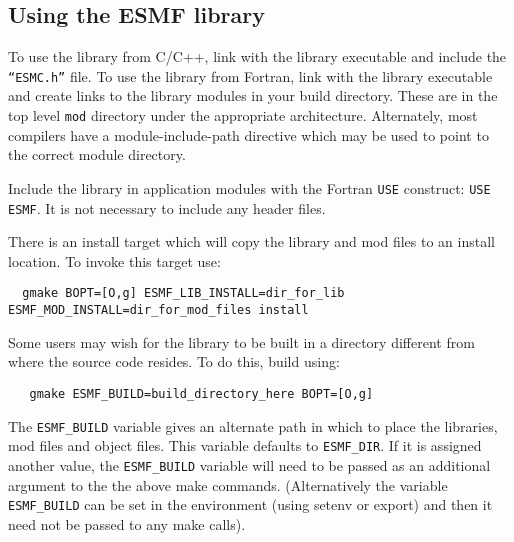 
\subsection{Using the ESMF library}
\label{UsingLibrary}
To use the library from C/C++, link with the library executable and include
the {\tt ``ESMC.h''} file.
To use the library from Fortran, link with the library executable and
create links to the library modules in your build directory.  These are
in the top level {\tt mod} directory under the appropriate architecture.  Alternately, 
most compilers have a module-include-path directive which may be used to point
to the correct module directory.

Include the library in application modules with the Fortran {\tt USE}
construct:  {\tt USE ESMF}.  It is not necessary to include any header files.

There is an install target which will copy the library and mod files to an
install location.  To invoke this target use:
\begin{verbatim}
  gmake BOPT=[O,g] ESMF_LIB_INSTALL=dir_for_lib ESMF_MOD_INSTALL=dir_for_mod_files install 
\end{verbatim}

Some users may wish for the library to be built in a directory different from 
where the source code resides.  To do this, build using:
\begin{verbatim}
   gmake ESMF_BUILD=build_directory_here BOPT=[O,g]
\end{verbatim}

The {\tt ESMF\_BUILD} variable gives an alternate path in which to place the libraries,
mod files and object files.  This variable defaults to {\tt ESMF\_DIR}.  If it is 
assigned another value, the {\tt ESMF\_BUILD} variable will need to be passed as
an additional argument to the the above make commands.  (Alternatively the variable
{\tt ESMF\_BUILD} can be set in the environment (using setenv or export) and then it 
need not be passed to any make calls).






